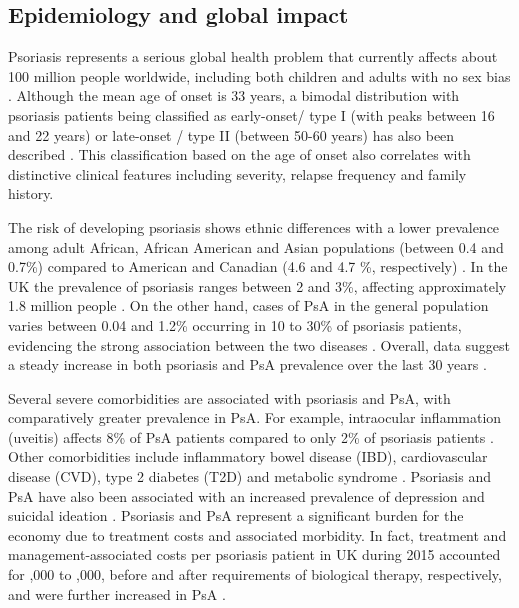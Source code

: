 \subsection{Epidemiology and global impact}
%
Psoriasis represents a serious global health problem that currently affects about 100 million people worldwide, including both children and adults with  no sex bias \parencite{Organization2016}. Although the mean age of onset is 33 years, a bimodal distribution with psoriasis patients being classified as early-onset/ type I (with peaks between 16 and 22 years) or late-onset / type II (between 50-60 years) has also been described \parencite{Henseler1985, Perera2012}. This classification based on the age of onset also correlates with distinctive clinical features including severity, relapse frequency and family history. 

The risk of developing psoriasis shows ethnic differences with a lower prevalence among adult African, African American and Asian populations (between 0.4 and 0.7\%) compared to American and Canadian (4.6 and 4.7 \%, respectively) \parencite{Jacobson2011}. In the UK the prevalence of psoriasis ranges between 2 and 3\%, affecting approximately 1.8 million people \parencite{Perera2012}. On the other hand, cases of PsA in the general population varies between 0.04 and 1.2\% occurring in 10 to 30\% of psoriasis patients, evidencing the strong association between the two diseases \parencite{Gelfand2005,Reich2015,Perera2012}. Overall, data suggest a steady increase in both psoriasis and PsA prevalence over the last 30 years \parencite{Springate2017,Organization2016}. 


Several severe comorbidities are associated with psoriasis and PsA, with comparatively greater prevalence in PsA. For example, intraocular inflammation (uveitis) affects 8\% of PsA patients compared to only 2\% of psoriasis patients \parencite{Husted2011, Oliveira2015}. Other comorbidities include inflammatory bowel disease (IBD), cardiovascular disease (CVD), type 2 diabetes (T2D) and metabolic syndrome \parencite{Gelfand2006,Shapiro2007,Cohen2008}. Psoriasis and PsA have also been associated with an increased prevalence of depression and suicidal ideation \parencite{Sampogna2012}. Psoriasis and PsA represent a significant burden for the economy due to treatment costs and associated morbidity. In fact, treatment and management-associated costs per psoriasis patient in UK during 2015 accounted for ,000 to ,000, before and after requirements of biological therapy, respectively, and were further increased in PsA \parencite{Burgos-Pol2016}.




